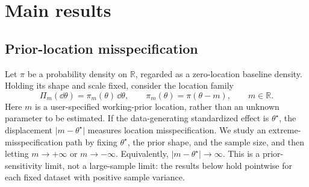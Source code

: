 \section{Main results}
\label{sec:mainresult}

\subsection{Prior-location misspecification}
\label{subsec:location-misspecification}

Let \(\pi\) be a probability density on \(\mathbb R\), regarded as a
zero-location baseline density. Holding its shape and scale fixed,
consider the location family
\begin{equation}
\label{eq:location-prior}
  \Pi_m(\dd\theta)
  =
  \pi_m(\theta)\,\dd\theta,
  \qquad
  \pi_m(\theta)
  =
  \pi(\theta-m),
  \qquad m\in\mathbb R.
\end{equation}
Here \(m\) is a user-specified working-prior location, rather than an
unknown parameter to be estimated.  If the data-generating standardized
effect is \(\theta^\star\), the displacement
\(\lvert m-\theta^\star\rvert\) measures location misspecification.
We study an extreme-misspecification path by fixing
\(\theta^\star\), the prior shape, and the sample size, and then letting
\(m\to+\infty\) or \(m\to-\infty\).  Equivalently,
\(\lvert m-\theta^\star\rvert\to\infty\).  This is a prior-sensitivity
limit, not a large-sample limit: the results below hold pointwise for
each fixed dataset with positive sample variance.

